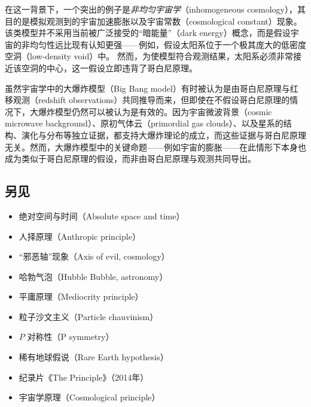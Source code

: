 在这一背景下，一个突出的例子是\emph{非均匀宇宙学}（inhomogeneous cosmology），其目的是模拟观测到的宇宙加速膨胀以及宇宙常数（cosmological constant）现象。该类模型并不采用当前被广泛接受的“暗能量”（dark energy）概念，而是假设宇宙的非均匀性远比现有认知更强——例如，假设太阳系位于一个极其庞大的低密度空洞（low-density void）中。\cite{ref32} 然而，为使模型符合观测结果，太阳系必须非常接近该空洞的中心，这一假设立即违背了哥白尼原理。

虽然宇宙学中的大爆炸模型（Big Bang model）有时被认为是由哥白尼原理与红移观测（redshift observations）共同推导而来，但即使在不假设哥白尼原理的情况下，大爆炸模型仍然可以被认为是有效的。因为宇宙微波背景（cosmic microwave background）、原初气体云（primordial gas clouds）、以及星系的结构、演化与分布等独立证据，都支持大爆炸理论的成立，而这些证据与哥白尼原理无关。然而，大爆炸模型中的关键命题——例如宇宙的膨胀——在此情形下本身也成为类似于哥白尼原理的假设，而非由哥白尼原理与观测共同导出。
\subsection{另见}
\begin{itemize}
\item 绝对空间与时间（Absolute space and time）
\item 人择原理（Anthropic principle）
\item “邪恶轴”现象（Axis of evil, cosmology） 
\item 哈勃气泡（Hubble Bubble, astronomy） 
\item 平庸原理（Mediocrity principle）
\item 粒子沙文主义（Particle chauvinism）
\item $P$ 对称性（P symmetry）
\item 稀有地球假说（Rare Earth hypothesis）
\item 纪录片《The Principle》（2014年）
\item 宇宙学原理（Cosmological principle）
\end{itemize}
